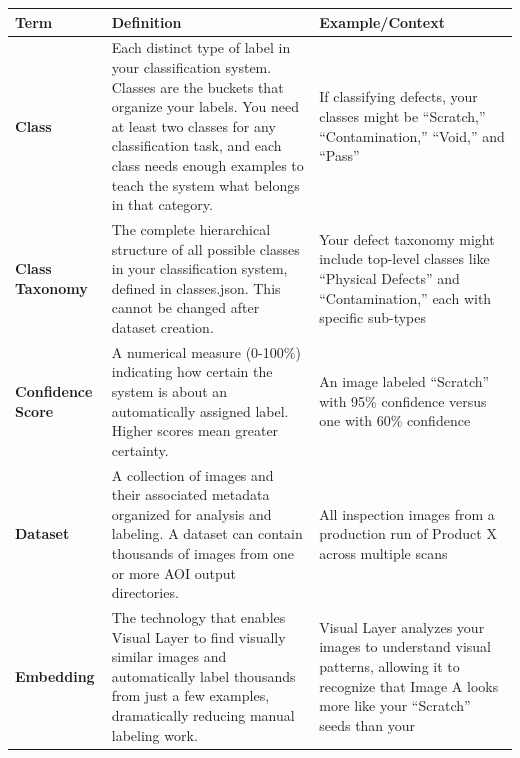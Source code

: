 \documentclass[
  11pt,
  a4paper,
  11pt,
  oneside]{report}
\renewcommand{\toprule}{\hline}
\renewcommand{\midrule}{\hline}
\renewcommand{\bottomrule}{\hline}
\begin{document}
\begin{longtable}[]{@{}
  >{\raggedright\arraybackslash}p{}
  >{\raggedright\arraybackslash}p{}
  >{\raggedright\arraybackslash}p{}@{}}
\toprule\noalign{}
\begin{minipage}[b]{\linewidth}\raggedright
\textbf{Term}
\end{minipage} & \begin{minipage}[b]{\linewidth}\raggedright
\textbf{Definition}
\end{minipage} & \begin{minipage}[b]{\linewidth}\raggedright
\textbf{Example/Context}
\end{minipage} \\
\midrule\noalign{}
\endhead
\bottomrule\noalign{}
\endlastfoot
\textbf{Class} & Each distinct type of label in your classification
system. Classes are the buckets that organize your labels. You need at
least two classes for any classification task, and each class needs
enough examples to teach the system what belongs in that category. & If
classifying defects, your classes might be ``Scratch,''
``Contamination,'' ``Void,'' and ``Pass'' \\
\textbf{Class Taxonomy} & The complete hierarchical structure of all
possible classes in your classification system, defined in classes.json.
This cannot be changed after dataset creation. & Your defect taxonomy
might include top-level classes like ``Physical Defects'' and
``Contamination,'' each with specific sub-types \\
\textbf{Confidence Score} & A numerical measure (0-100\%) indicating how
certain the system is about an automatically assigned label. Higher
scores mean greater certainty. & An image labeled ``Scratch'' with 95\%
confidence versus one with 60\% confidence \\
\textbf{Dataset} & A collection of images and their associated metadata
organized for analysis and labeling. A dataset can contain thousands of
images from one or more AOI output directories. & All inspection images
from a production run of Product X across multiple scans \\
\textbf{Embedding} & The technology that enables Visual Layer to find
visually similar images and automatically label thousands from just a
few examples, dramatically reducing manual labeling work. & Visual Layer
analyzes your images to understand visual patterns, allowing it to
recognize that Image A looks more like your ``Scratch'' seeds than your

\end{longtable}
\end{document}
